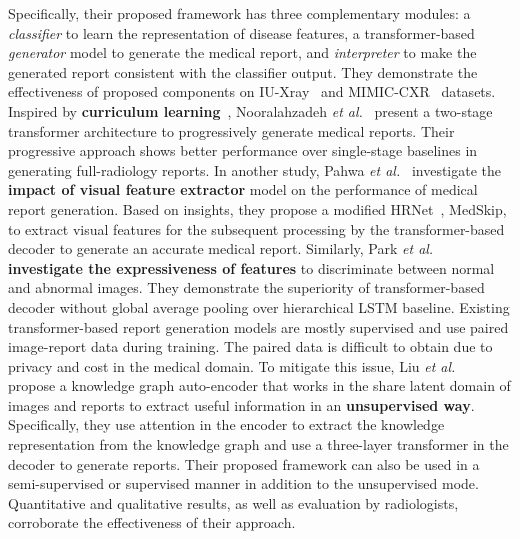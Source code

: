 \documentclass[10pt,journal,compsoc]{IEEEtran}
\begin{document}
Specifically, their proposed framework has three complementary modules: a \textit{classifier} to learn the representation of disease features, a transformer-based \textit{generator} model to generate the medical report, and \textit{interpreter} to make the generated report consistent with the classifier output. They demonstrate the effectiveness of proposed components on IU-Xray~\cite{demner2016preparing} and MIMIC-CXR~\cite{johnson2019mimic} datasets. %
Inspired by \textbf{curriculum learning}~\cite{bengio2009curriculum}, Nooralahzadeh \textit{et al.}~\cite{nooralahzadeh2021progressive} present a two-stage transformer architecture to progressively generate medical reports. Their progressive approach shows better performance over single-stage baselines in generating full-radiology reports. %
In another study, Pahwa \textit{et al.}~\cite{pahwa2021medskip} investigate the \textbf{impact of visual feature extractor} model on the performance of medical report generation. Based on insights, they propose a modified HRNet~\cite{sun2019deep}, MedSkip, to extract visual features for the subsequent processing by the transformer-based decoder to generate an accurate medical report. %
Similarly, Park \textit{et al.}~\cite{park2021medical} \textbf{investigate the expressiveness of features} to discriminate between normal and abnormal images. They demonstrate the superiority of transformer-based decoder without global average pooling over hierarchical LSTM baseline.
Existing transformer-based report generation models are mostly supervised and use paired image-report data during training. The paired data is difficult to obtain due to privacy and cost in the medical domain. To mitigate this issue, Liu \textit{et al.}~\cite{liu2021auto} propose a knowledge graph auto-encoder that works in the share latent domain of images and reports to extract useful information in an \textbf{unsupervised way}. Specifically, they use attention in the encoder to extract the knowledge representation from the knowledge graph and use a three-layer transformer in the decoder to generate reports. Their proposed framework can also be used in a semi-supervised or supervised manner in addition to the unsupervised mode.
Quantitative and qualitative results, as well as evaluation by radiologists, corroborate the effectiveness of their approach.  %
\end{document}
